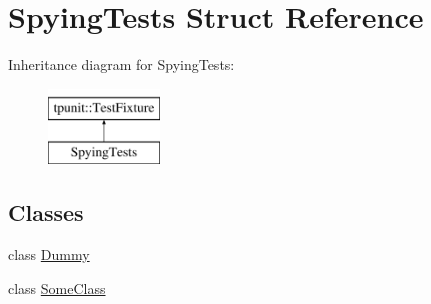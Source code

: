 \hypertarget{structSpyingTests}{}\section{Spying\+Tests Struct Reference}
\label{structSpyingTests}
Inheritance diagram for Spying\+Tests\+:\begin{figure}[H]
\begin{center}
\leavevmode
\includegraphics[height=2.000000cm]{structSpyingTests}
\end{center}
\end{figure}
\subsection*{Classes}
\begin{DoxyCompactItemize}
\item 
class \mbox{\hyperlink{classSpyingTests_1_1Dummy}{Dummy}}
\item 
class \mbox{\hyperlink{classSpyingTests_1_1SomeClass}{Some\+Class}}
\end{DoxyCompactItemize}

